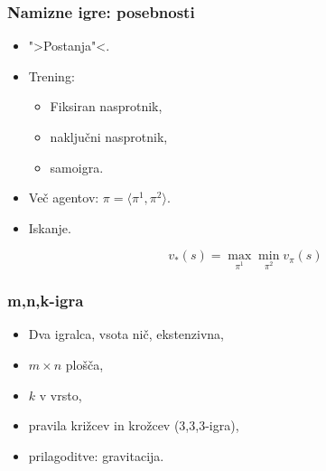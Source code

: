 \documentclass{beamer}    %
\begin{document}
\begin{frame}
    \frametitle{Namizne igre: posebnosti}
    \begin{itemize}
        \item ">Postanja"<. 
        \item Trening: 
                \begin{itemize}
                    \item Fiksiran nasprotnik, 
                    \item naključni nasprotnik,
                    \item samoigra.
                \end{itemize}
        \item Več agentov: $\pi = \langle \pi^1, \pi ^2 \rangle$.
        \item Iskanje.
        
        \medskip
        \medskip
        $$
        v_*(s) = \max_{\pi^1} \min_{\pi^2} v_\pi(s)
        $$
    \end{itemize}
\end{frame}


\begin{frame}
    \frametitle{m,n,k-igra}
    \begin{itemize}
        \item Dva igralca, vsota nič, ekstenzivna,
        \item $m \times n$ plošča, 
        \item $k$ v vrsto, 
        \item pravila križcev in krožcev (3,3,3-igra),
        \item prilagoditve: gravitacija.
    \end{itemize}
\end{frame}
\end{document}
